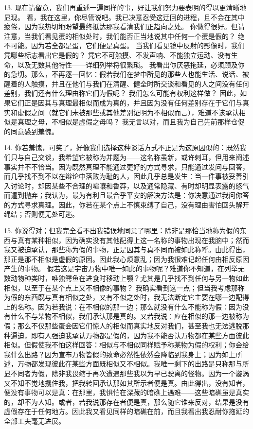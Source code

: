 13.  现在请留意，我们再重述一遍同样的事，好让我们努力要表明的得以更清晰地显现。 看，我在这里，你尽管说吧。我已决意忍受这迂回的进程，且不会在其中疲倦，因为我热切地盼望最终抵达那我看清我们正趋向之处。 你做得很好。但请注意，当我们看见蛋的相似处时，我们能否正当地说其中任何一个蛋是假的？ 绝不可能。因为若全都是蛋，它们便是真蛋。 当我们看见镜中反射的影像时，我们凭哪些标志看出它是假的？ 凭它不可触摸、不发声响、不能独立运动、没有生命，以及无数其他特性——详细列举将很繁琐。 我看出你厌恶拖延，必须顾及你的急切。那么，不再逐一回忆：假若我们在梦中所见的那些人也能生活、说话、被醒着的人触摸，并且在他们与我们在清醒、健全时所交谈和看见的人之间没有任何差别，我们还有什么理由称它们为假呢？ 我们怎么可能有权利这样做？ 因此，如果它们正是因其与真理最相似而成为真的，并且因为没有任何差别存在于它们与真实和虚假之间（就它们未被那些或其他差别证明为不相似而言），难道不该承认相似是真理之母，不相似是虚假之母吗？ 我无言以对，而且我为自己先前那样仓促的同意感到羞愧。\par

14.  你若羞愧，可笑了，好像我们选择这种谈话方式不正是为这原因似的：既然我们只与自己交谈，我希望它被称为并题为——这名称虽新，或许刺耳，但用来阐述事实并不不恰当。因为既然真理不能通过更好的方式寻求，只能通过发问与回答，而几乎找不到不以在辩论中落败为耻的人，因此几乎总是发生：当一件事被妥善引入讨论时，却因某些不合理的喧嚷和鲁莽，以及通常隐藏、有时却明显表露的怒气而遭到抛弃；我认为，最为有利且最合乎平安的解决方法是：你决意通过我问你答的方式寻求真理。因此，你若在某个点上不慎束缚了自己，没有理由害怕回头解开绳结；否则便无处可逃。\par

15.  你说得对；但我完全看不出我错误地同意了哪里：除非是那恰当地称为假的东西与真有某种相似，因为确实没有其他配得上这一名称的事物出现在我脑中；然而我又被迫承认，那些称为假的事物，正是因其与真不同而被如此称呼。由此得出，那正是那不相似是虚假的原因。因此我心烦意乱；因为我很难记起任何由相反原因产生的事物。 假若这是宇宙万物中唯一如此的事物呢？难道你不知道，在列举无数动物种类时，唯独鳄鱼在进食时移动上颚？尤其是几乎找不到任何与另一物如此相似，以至于在某个点上又不相像的事物？ 我确实看到这一点；但当我考虑那称为假的东西既与真有相似之处，又有不似之处时，我无法断定它主要在哪一边配得上的名称。因为若我说：在不相似的那一边；那么就没有什么不能称为假：因为没有什么不与某物不相似，我们承认那是真的。又若我说：应在相似的那一边被称为假；那么不仅那些蛋会因它们惊人的相似而真实地反对我们，甚至我也无法逃脱那种逼迫，即有人强迫我承认万物都是假的，因为我不能否认万物都在某些方面彼此相似。但假使我不怕这样回答：相似与不相似同样赋予称某物为假的权利；你会给我什么出路？因为宣布万物皆假的致命必然性依然会降临到我身上；因为如上所述，万物都发现彼此在某些方面既相似又不相似。我唯一剩下的出路是只称那与所显不同者为假，除非我畏缩于再次遭遇那些我以为早已驶离的怪物。因为一个漩涡又不知不觉地攫住我，把我转回承认那如其所示者便是真。由此得出，没有知者，便没有事物可以是真：在那里，我惧怕在深藏的暗礁上遇难——这些暗礁虽是真实的，却不为人知。或者，若我说那存在者便是真，那么随它谁来反对，结果是没有虚假存在于任何地方。因此我又看见同样的暗礁在前，而且我看出我忍耐你拖延的全部工夫毫无进展。\par

